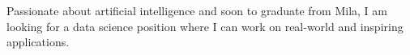 

\begin{cvparagraph}




Passionate about artificial intelligence and soon to graduate from Mila, I am looking for a data science position where I can work on real-world and inspiring applications.


\end{cvparagraph}
